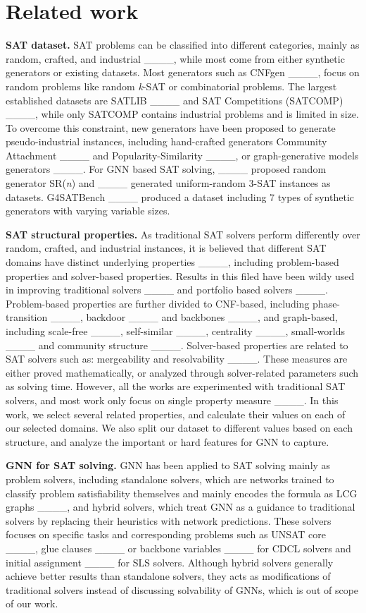 \section{Related work}
\textbf{SAT dataset.}
SAT problems can be classified into different categories, mainly as random, crafted, and industrial ____, while most come from either synthetic generators or existing datasets. Most generators such as CNFgen ____, focus on random problems like random \textit{k}-SAT or combinatorial problems. The largest established datasets are SATLIB ____ and SAT Competitions (SATCOMP) ____, while only SATCOMP contains industrial problems and is limited in size. To overcome this constraint, new generators have been proposed to generate pseudo-industrial instances, including hand-crafted generators Community Attachment ____ and Popularity-Similarity  ____, or graph-generative models generators ____. For GNN based SAT solving, ____ proposed random generator SR(\textit{n}) and ____ generated uniform-random 3-SAT instances as datasets. G4SATBench ____ produced a dataset including 7 types of synthetic generators with varying variable sizes.


\textbf{SAT structural properties.}
As traditional SAT solvers perform differently over random, crafted, and industrial instances, it is believed that different SAT domains have distinct underlying properties ____, including problem-based properties and solver-based properties. Results in this filed have been wildy used in improving traditional solvers ____ and portfolio based solvers ____. 
Problem-based properties are further divided to CNF-based, including phase-transition ____, backdoor ____ and  backbones ____, and graph-based, including scale-free ____, self-similar ____, centrality ____, small-worlds ____ and community structure ____. Solver-based properties are related to SAT solvers such as: mergeability and resolvability ____. These measures are either proved mathematically, or analyzed through solver-related parameters such as solving time. However, all the works are experimented with traditional SAT solvers, and most work only focus on single property measure ____. In this work, we select several related properties, and calculate their values on each of our selected domains. We also split our dataset to different values based on each structure, %
and analyze the important or hard features for GNN to capture. %


\textbf{GNN for SAT solving.} GNN has been applied to SAT solving mainly as problem solvers, including standalone solvers, which are networks trained to classify problem satisfiability themselves and mainly encodes the formula as LCG graphs ____, and hybrid solvers, which treat GNN as a guidance to traditional solvers by replacing their heuristics with network predictions. These solvers focuses on specific tasks and corresponding problems such as UNSAT core ____, glue clauses ____ or backbone variables ____ for CDCL solvers and initial assignment ____ for SLS solvers. Although hybrid solvers generally achieve better results than standalone solvers, they acts as modifications of traditional solvers instead of discussing solvability of GNNs,  which is out of scope of our work.